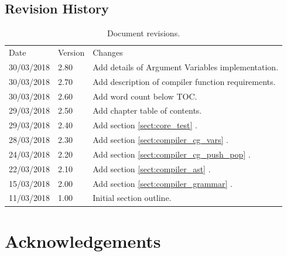 \documentclass[11pt,a4paper]{report}
\begin{document}
\pagestyle{plain}

\section*{Revision History}
\begin{table}[h]
\def\arraystretch{1.5}
    \begin{tabularx}{\textwidth}{|l|l|X|}
    \hline
    Date & Version & Changes \\
    \arrayrulecolor{blue9}
	\specialrule{2pt}{-2pt}{0pt}
	30/03/2018 & 2.80 & Add details of Argument Variables implementation. \\ \hline
	30/03/2018 & 2.70 & Add description of compiler function requirements. \\ \hline
	30/03/2018 & 2.60 & Add word count below TOC. \\ \hline
	29/03/2018 & 2.50 & Add chapter table of contents. \\ \hline
	29/03/2018 & 2.40 & Add section \ref{sect:core_test} \nameref{sect:core_test}. \\ \hline
	28/03/2018 & 2.30 & Add section \ref{sect:compiler_cg_vars} \nameref{sect:compiler_cg_vars}. \\ \hline
	24/03/2018 & 2.20 & Add section \ref{sect:compiler_cg_push_pop} \nameref{sect:compiler_cg_push_pop}. \\ \hline
	22/03/2018 & 2.10 & Add section \ref{sect:compiler_ast} \nameref{sect:compiler_ast}. \\ \hline
	15/03/2018 & 2.00 & Add section \ref{sect:compiler_grammar} \nameref{sect:compiler_grammar}. \\ \hline
	11/03/2018 & 1.00 & Initial section outline. \\ \hline
    \end{tabularx}
    \caption{Document revisions.}
\end{table}

\newpage
\chapter*{Acknowledgements}

\newpage
\end{document}
